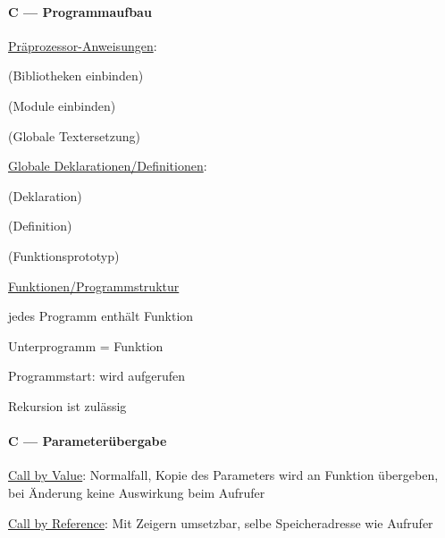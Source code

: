 \paragraph{C --- Programmaufbau}
\begin{enumeration}
  \item \underline{Präprozessor-Anweisungen}:
  \begin{enumeration}
    \item {} (Bibliotheken einbinden)
    \item {} (Module einbinden)
    \item {} (Globale Textersetzung)
  \end{enumeration}
  \item \underline{Globale Deklarationen/Definitionen}:
  \begin{enumeration}
    \item {} (Deklaration)
    \item {} (Definition)
    \item {} (Funktionsprototyp)
  \end{enumeration}

  \item \underline{Funktionen/Programmstruktur}
  \begin{items}
    \item {}
    \item jedes Programm enthält Funktion 
    \item Unterprogramm = Funktion
    \item Programmstart:  wird aufgerufen
    \item Rekursion ist zulässig
  \end{items}
\end{enumeration}

\paragraph{C --- Parameterübergabe}
\begin{enumeration}
  \item \underline{Call by Value}: Normalfall, Kopie des Parameters wird an Funktion übergeben, bei Änderung keine Auswirkung beim Aufrufer
  \item \underline{Call by Reference}: Mit Zeigern umsetzbar, selbe Speicheradresse wie Aufrufer
\end{enumeration}

